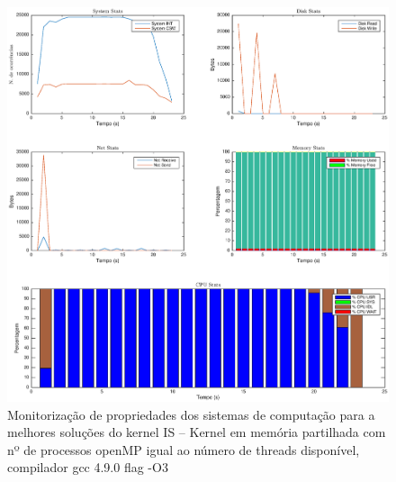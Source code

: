\documentclass[conference,compsoc]{IEEEtran}
\begin{document}
\begin{figure}
\centering
\includegraphics[width=1\textwidth]{EPS/DSTAT/EP_OMP_24_GCC.eps}
\caption{Monitorização de propriedades dos sistemas de computação para a melhores soluções do kernel IS -- Kernel em memória partilhada com nº de processos openMP igual ao número de threads disponível, compilador gcc 4.9.0 flag -O3}
\label{dstat_ep}
\end{figure}
\end{document}
